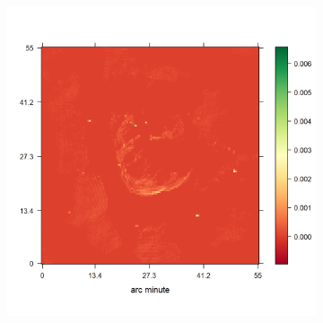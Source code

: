 \begin{figure}[h!]
\begin{subfigure}[b]{0.32\linewidth}
	\end{subfigure}
	\begin{subfigure}[b]{0.32\linewidth}
		\includegraphics[width=\linewidth, trim={20px 50px 75px 52px}, clip]{./chapters/05.results/g55/L1+L2_model.png}
	\end{subfigure}


\end{figure}
